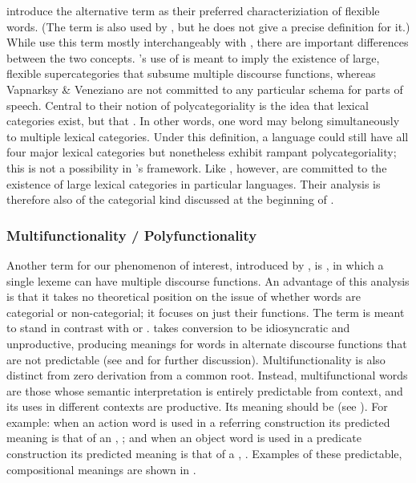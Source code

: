 \textcite[4]{VapnarksyVeneziano2017} introduce the alternative term  as their preferred characteriziation of flexible words. (The term is also used by \textcite{Carter2006}, but he does not give a precise definition for it.) While \citeauthor{VapnarksyVeneziano2017} use this term mostly interchangeably with , there are important differences between the two concepts. \citeauthor{Hengeveld1992}'s use of  is meant to imply the existence of large, flexible supercategories that subsume multiple discourse functions, whereas Vapnarksy \& Veneziano are not committed to any particular schema for parts of speech. Central to their notion of polycategoriality is the idea that lexical categories exist, but that . In other words, one word may belong simultaneously to multiple lexical categories. Under this definition, a language could still have all four major lexical categories but nonetheless exhibit rampant polycategoriality; this is not a possibility in \citeauthor{Hengeveld1992}'s framework. Like \citeauthor{Hengeveld1992}, however, \citeauthor{VapnarksyVeneziano2017} are committed to the existence of large lexical categories in particular languages. Their analysis is therefore also of the categorial kind discussed at the beginning of .

\subsubsection{Multifunctionality / Polyfunctionality}
\label{sec:2.3.1.3}

Another term for our phenomenon of interest, introduced by \parencite{Lier2012}, is , in which a single lexeme can have multiple discourse functions. An advantage of this analysis is that it takes no theoretical position on the issue of whether words are categorial or non-categorial; it focuses on just their functions. The term  is meant to stand in contrast with  or . \citeauthor{Lier2012} takes conversion to be idiosyncratic and unproductive, producing meanings for words in alternate discourse functions that are not predictable (see  and  for further discussion). Multifunctionality is also distinct from zero derivation from a common root. Instead, multifunctional words are those whose semantic interpretation is entirely predictable from context, and its uses in different contexts are productive. Its meaning should be  (see ). For example: when an action word is used in a referring construction its predicted meaning is that of an , ; and when an object word is used in a predicate construction its predicted meaning is that of a , . Examples of these predictable, compositional meanings are shown in .

